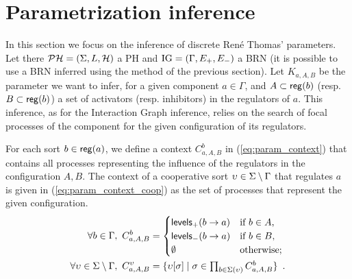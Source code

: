 \section{Parametrization inference}



In this section we focus on the inference of discrete René Thomas' parameters.
Let there $\mathcal{PH} = (\Sigma,L,\mathcal{H})$ a PH and $\mathrm{IG} = (\Gamma,E_+,E_-)$ a BRN (it is possible to use a BRN inferred using the method of the previous section).
Let $K_{a,A,B}$ be the parameter we want to infer, for a given component $a \in \Gamma$, and $A
\subset \mathsf{reg}({b})$ (resp. $B \subset \mathsf{reg}({b})$) a set of activators (resp.
inhibitors) in the regulators of $a$. This inference, as for the Interaction Graph inference, relies
on the search of focal processes of the component for the given configuration of its regulators.

For each sort $b \in \mathsf{reg}({a})$, we define a context $C^b_{a,A,B}$ in
(\ref{eq:param_context}) that contains all processes representing the influence of the regulators in
the configuration $A,B$. The context of a cooperative sort $\upsilon \in \Sigma\setminus\Gamma$ that
regulates $a$ is given in (\ref{eq:param_context_coop}) as the set of processes that represent the
given configuration.
\begin{align}
\label{eq:param_context}
\forall b\in\Gamma,~
C_{a,A,B}^b & = \begin{cases}
\mathsf{levels}_+(b\rightarrow a) & \text{if $b \in A$,}\\
\mathsf{levels}_-(b\rightarrow a) & \text{if $b \in B$,}\\
\emptyset & \text{otherwise;}
\end{cases}
\\
\label{eq:param_context_coop}
\forall \upsilon \in \Sigma\setminus\Gamma,~
C_{a,A,B}^\upsilon & = \{
\upsilon[\sigma] \mid \sigma \in \textstyle\prod_{b \in \Sigma(\upsilon)}C_{a,A,B}^b \}
\enspace.
\end{align}

